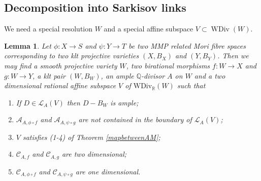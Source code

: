\documentclass{article}
\newtheorem{lem}[defn]{Lemma}
\begin{document}
\subsection{Decomposition into Sarkisov links}
We need a special resolution $W$ and a special  affine subspace $V \subset \operatorname{WDiv}(W)$.
\begin{lem}\label{keylemma}
  \cite[Lemma 4.1]{haconSarkisovProgram2012} Let $ \phi:X\to S $ and $ \psi :Y\to T  $ be two MMP related Mori fibre spaces corresponding to two klt projective varieties $ (X,B_X) $ and $ (Y,B_Y) $. Then we may find a smooth projective variety $ W $, two birational morphisms $ f:W\to X $ and $ g:W\to Y $, a klt pair $ (W,B_{W}) $, an ample $ \mathbb{Q} $-divisor $ A $ on $ W $ and a two dimensional rational affine subspace $ V $ of $ \mathrm{WDiv}_\mathbb{R}(W) $ such that 
  \begin{enumerate}
    \item If $ D\in \mathcal{L}_A(V) $ then $ D-B_W $ is ample;
    \item $ \mathcal{A}_{A,\phi\circ f} $ and $ \mathcal{A}_{A,\psi\circ g} $ are not contained in the boundary of $ \mathcal{L}_A(V) $;
    \item $ V $ satisfies (1-4) of Theorem \ref{mapbetweenAM};
    \item $ \mathcal{C}_{A,f} $ and $ \mathcal{C}_{A,g} $ are two dimensional;
    \item $ \mathcal{C}_{A,\phi\circ f} $ and $ \mathcal{C}_{A,\psi\circ g} $ are one dimensional.
  \end{enumerate}
\end{lem}
\end{document}

